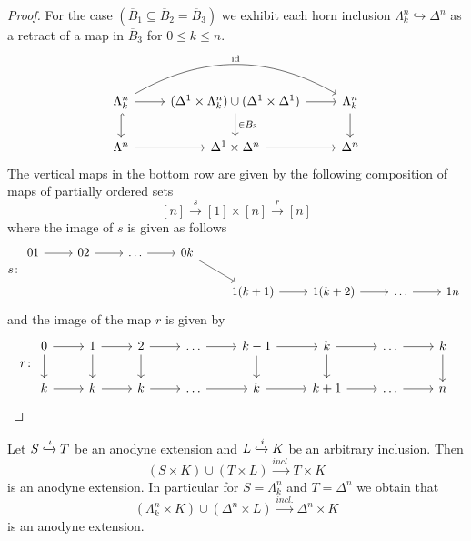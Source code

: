 \begin{proof}
    For the case $(\overline{B}_1 \subseteq \overline{B}_2 = \overline{B}_3 )$ we exhibit each horn inclusion $\Lambda_k^n \hookrightarrow \Delta^n$ as a retract of a map in $\overline{B}_3$ for $0 \leq k \leq n$.
    \[
    \begin{tikzcd}
        \Lambda_k^n 
        \ar[r]
        \ar[d, hook]
        \ar[rr, bend left, "\id"]
        &
        (\Delta^1 \times \Lambda_k^n) \cup ( \Delta^{1} \times \Delta^1) 
        \ar[r]
        \ar[d, " \in B_3"]
        &
        \Lambda_k^n
        \ar[d]
        \\
        \Lambda^n 
        \ar[r]
        &
        \Delta^1 \times \Delta^n
        \ar[r]
        &
        \Delta^n
    \end{tikzcd}
    \]
    The vertical maps in the bottom row are given by the following composition of maps of partially ordered sets 
    \[
        [n] \xrightarrow{s} [1] \times [n] \xrightarrow{r} [n]    
    \]
    where the image of $s$ is given as follows
    \[
    s\colon
    \begin{tikzcd}
         01
        \ar[r]
        &
        02
        \ar[r]
        &
        \dotsc
        \ar[r]
        &
        0k
        \ar[rd]
        &
        \\
        &&&&
        1(k+1)
        \ar[r]
        &
        1(k+2)
        \ar[r]
        &
        \dotsc
        \ar[r]
        &
        1n
    \end{tikzcd}
    \]
    and the image of the map $r$ is given by
    \[
    r\colon
    \begin{tikzcd}
        0
        \ar[r]
        \ar[d]
        &
        1
        \ar[r]
        \ar[d]
        &
        2
        \ar[r]
        \ar[d]
        &
        \dotsc
        \ar[r]
        &
        k-1
        \ar[r]
        \ar[d]
        &
        k
        \ar[r]
        \ar[d]
        &
        \dotsc
        \ar[r]
        &
        k
        \ar[d]
        \\
        k
        \ar[r]
        &
        k
        \ar[r]
        &
        k
        \ar[r]
        &
        \dotsc
        \ar[r]
        &
        k
        \ar[r]
        &
        k+1
        \ar[r]
        &
        \dotsc
        \ar[r]
        &
        n
    \end{tikzcd}
    \]
\end{proof}

\begin{cor}
    Let $ S \xhookrightarrow{\iota} T$ be an anodyne extension and $L \xhookrightarrow{i}  K$ be an arbitrary inclusion.
    Then 
    \[
        (S \times K) \cup (T \times L) \xrightarrow{incl.} T \times K
    \]
    is an anodyne extension.
    In particular for $S= \Lambda_k^n$ and $T=\Delta^n$ we obtain that 
    \[
        (\Lambda_k^n \times K) \cup (\Delta^n \times L) \xrightarrow{incl.} \Delta^n \times K
    \]
    is an anodyne extension.
\end{cor}

